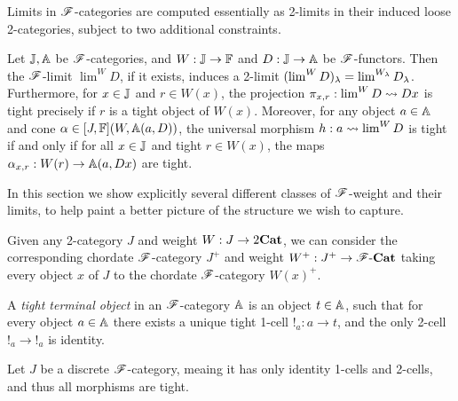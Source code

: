\documentclass[../thesis.tex]{subfiles}
\begin{document}
  Limits in ${\mathscr{F}}$-categories are computed essentially as 2-limits in their induced loose 2-categories,
  subject to two additional constraints.
  \begin{theorem}
    Let ${\mathbb{J}},{\mathbb{A}}$ be ${\mathscr{F}}$-categories, and $W : {\mathbb{J}} \to {\mathbb{F}}$ and $D : {\mathbb{J}} \to {\mathbb{A}}$ be ${\mathscr{F}}$-functors.
    Then the ${\mathscr{F}}$-limit $\lim^W D$, if it exists, induces a 2-limit $(\lim^W D)_\lambda = \lim^{W_%
    \lambda} D_\lambda$. Furthermore, for $x \in {\mathbb{J}}$ and $r \in W(x)$, the projection $\pi_{x,r}
    : \lim^W D \rightsquigarrow Dx$ is tight precisely if $r$ is a tight object of $W(x)$. Moreover, for any
    object $a \in {\mathbb{A}}$ and cone $\alpha \in [J,{\mathbb{F}}](W,{\mathbb{A}}(a,D))$, the universal morphism
    $h : a \rightsquigarrow \lim^W D$ is tight if and only if for all $x \in {\mathbb{J}}$ and tight $r \in W(x)$,
    the maps $\alpha_{x,r} : W(r) \to {\mathbb{A}}(a,Dx)$ are tight.
  \end{theorem}

  In this section we show explicitly several different classes of ${\mathscr{F}}$-weight and their limits, to
  help paint a better picture of the structure we wish to capture. 

  \begin{example}
    Given any 2-category $J$ and weight $W : J \to 2{\mathbf{Cat}}$, we can consider the corresponding
    chordate ${\mathscr{F}}$-category $J^+$ and weight $W^+ : J^+ \to {\mathscr{F}}\text-{\mathbf{Cat}}$ taking every object
    $x$ of $J$ to the chordate ${\mathscr{F}}$-category $W(x)^+$. 
  \end{example}
  
  \begin{example}
    A \emph{tight terminal object} in an ${\mathscr{F}}$-category ${\mathbb{A}}$ is an object $t \in {\mathbb{A}}$, such that for
    every object $a \in {\mathbb{A}}$ there exists a unique tight 1-cell $!_a : a \to t$, and the only 2-cell
    $!_a \to\mathop{!}_a$ is identity. 
  \end{example}


  \begin{example}
    Let $J$ be a discrete ${\mathscr{F}}$-category, meaing it has only identity 1-cells and 2-cells, and thus all
    morphisms are tight.
  \end{example}



\end{document}
